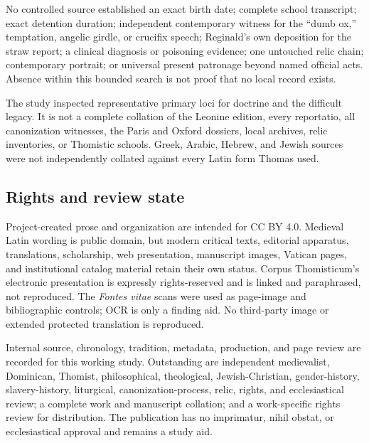 No controlled source established an exact birth date; complete school
transcript; exact detention duration; independent contemporary witness for the
``dumb ox,'' temptation, angelic girdle, or crucifix speech; Reginald's own
deposition for the straw report; a clinical diagnosis
or poisoning evidence; one untouched relic chain; contemporary portrait; or
universal present patronage beyond named official acts.  Absence within this
bounded search is not proof that no local record exists.

The study inspected representative primary loci for doctrine and the difficult
legacy.  It is not a complete collation of the Leonine edition, every
reportatio, all canonization witnesses, the Paris and Oxford dossiers, local
archives, relic inventories, or Thomistic schools.  Greek, Arabic, Hebrew, and
Jewish sources were not independently collated against every Latin form Thomas
used.

\subsection{Rights and review state}

Project-created prose and organization are intended for CC BY 4.0.  Medieval
Latin wording is public domain, but modern critical texts, editorial apparatus,
translations, scholarship, web presentation, manuscript images, Vatican pages,
and institutional catalog material retain their own status.  Corpus
Thomisticum's electronic presentation is expressly rights-reserved and is
linked and paraphrased, not reproduced.  The \emph{Fontes vitae} scans were
used as page-image and bibliographic controls; OCR is only a finding aid.  No
third-party image or extended protected translation is reproduced.

Internal source, chronology, tradition, metadata, production, and page review
are recorded for this working study.  Outstanding are independent medievalist,
Dominican, Thomist, philosophical, theological, Jewish-Christian,
gender-history, slavery-history, liturgical, canonization-process, relic,
rights, and ecclesiastical review; a complete work and manuscript collation;
and a work-specific rights review for distribution.  The publication has no
imprimatur, nihil obstat, or ecclesiastical approval and remains a study aid.
